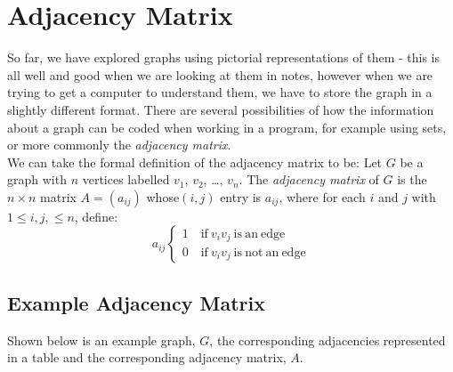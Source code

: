 \section{Adjacency Matrix}
So far, we have explored graphs using pictorial representations of them - this is all well and good when we are looking at them in notes, however when we are trying to get a computer to understand them, we have to store the graph in a slightly different format. There are several possibilities of how the information about a graph can be coded when working in a program, for example using sets, or more commonly the \textit{adjacency matrix}.\\

We can take the formal definition of the adjacency matrix to be: Let $G$ be a graph with $n$ vertices labelled $v_1$, $v_2$, \ldots, $v_n$. The \textit{adjacency matrix} of $G$ is the $n \times n$ matrix $A=(a_{ij})$ whose$(i,j)$ entry is $a_{ij}$, where for each $i$ and $j$ with $1 \leq i,j, \leq n$, define:
\[ a_{ij} \begin{cases}
    1 \quad \mathrm{if\ } v_i v_j \mathrm{\ is\ an\ edge} \\
    0 \quad \mathrm{if\ } v_i v_j \mathrm{\ is\ not\ an\ edge}
\end{cases} \]

\subsection{Example Adjacency Matrix}
Shown below is an example graph, $G$, the corresponding adjacencies represented in a table and the corresponding adjacency matrix, $A$.

